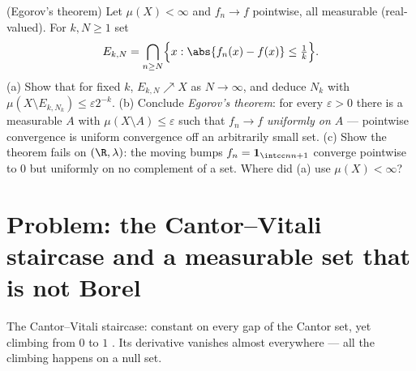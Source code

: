 \begin{exercise}[$\star\star\star$]\label{exo:b3:measure:12}
(Egorov's theorem) Let $\mu(X) < \infty$ and $f_n \to f$
pointwise, all measurable (real-valued). For $k, N \geq 1$
set
\[
E_{k,N} = \bigcap_{n \geq N}\Bigl\{x : \abs{f_n(x) - f(x)}
\leq \tfrac1k\Bigr\} .
\]
(a) Show that for fixed $k$, $E_{k,N} \nearrow X$ as $N \to
\infty$, and deduce $N_k$ with $\mu(X \setminus E_{k,N_k})
\leq \varepsilon2^{-k}$.
(b) Conclude \emph{Egorov's theorem}: for every $\varepsilon
> 0$ there is a measurable $A$ with $\mu(X\setminus A) \leq
\varepsilon$ such that $f_n \to f$ \emph{uniformly on $A$}
--- pointwise convergence is uniform convergence off an
arbitrarily small set.
(c) Show the theorem fails on $(\R, \lambda)$: the moving
bumps $f_n = \mathbf 1_{\intcc n{n+1}}$ converge pointwise
to $0$ but uniformly on no complement of a 
set. Where did (a) use $\mu(X) < \infty$?
\end{exercise}

\section{Problem: the Cantor--Vitali staircase and a
measurable set that is not Borel}

\begin{omfigure}

{\small The Cantor--Vitali staircase: constant on every gap of
the Cantor set, yet climbing from $0$ to $1$ . Its
derivative vanishes almost everywhere --- all the climbing
happens on a null set.}
\end{omfigure}

